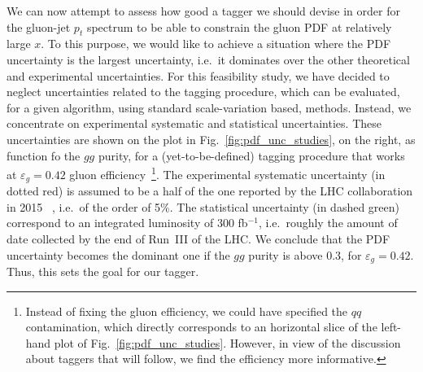 We can now attempt to assess how good a tagger we should devise in order for the gluon-jet $p_t$ spectrum to be able to constrain the gluon PDF at relatively large $x$. To this purpose, we would like to achieve a situation where the PDF uncertainty is the largest uncertainty, i.e.\ it dominates over the other theoretical and experimental uncertainties. For this feasibility study, we have decided to neglect uncertainties related to the tagging procedure, which can be evaluated, for a given algorithm, using standard scale-variation based, methods. Instead, we concentrate on experimental systematic and statistical uncertainties. These uncertainties are shown on the plot in Fig.~\ref{fig:pdf_unc_studies}, on the right, as function fo the $gg$ purity, for a (yet-to-be-defined) tagging procedure that works at $\varepsilon_g=0.42$ gluon efficiency~\footnote{Instead of fixing the gluon efficiency, we could have specified the $qq$ contamination, which directly corresponds to an horizontal slice of the left-hand plot of Fig.~\ref{fig:pdf_unc_studies}. However, in view of the discussion about taggers that will follow, we find the efficiency more informative.}. 
%
The experimental systematic uncertainty (in dotted red)  is assumed to be a half of the one reported by the LHC collaboration in 2015~\cite{} , i.e.\ of the order of 5\%. The statistical uncertainty (in dashed green) correspond to an integrated luminosity of 300 fb$^{-1}$, i.e.\ roughly the amount of date collected by the end of Run~III of the LHC.
%
We conclude that the PDF uncertainty becomes the dominant one if the $gg$ purity is above 0.3, for $\varepsilon_g=0.42$. Thus, this sets the goal for our tagger.

